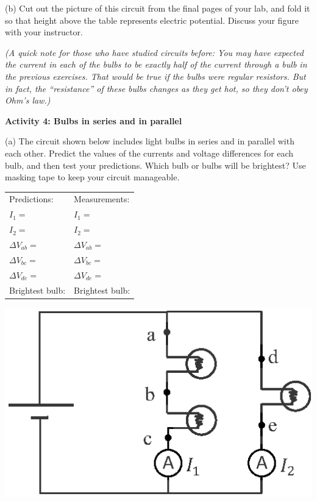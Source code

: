 (b) Cut out the picture of this circuit from the final pages of your lab, and fold it so that height above the table represents electric potential.  Discuss your figure with your instructor. 

\textit{(A quick note for those who have studied circuits before:  You may have expected the current in each of the bulbs to be exactly half of the current through a bulb in the previous exercises.  That would be true if the bulbs were regular resistors.  But in fact, the ``resistance'' of these bulbs changes as they get hot, so they don't obey Ohm's law.)}

\textbf{Activity 4: Bulbs in series and in parallel} \par
\nopagebreak
(a) The circuit shown below includes light bulbs in series and in parallel with each other.  Predict the values of the currents and voltage differences for each bulb, and then test your predictions.  Which bulb or bulbs will be brightest? Use masking tape to keep your circuit manageable.


\begin{minipage}{0.6\textwidth}
\vspace{0.1 in}
{\renewcommand{\arraystretch}{1.6}
\hspace*{0.5in}
\begin{tabular}{l l}
Predictions: \hspace{0.7in} & Measurements: \\
$I_1 =$ & $I_1 =$ \\
$I_2 =$ & $I_2 =$ \\
$\Delta V_{ab} =$ & $\Delta V_{ab} =$ \\
$\Delta V_{bc} =$ & $\Delta V_{bc} =$ \\
$\Delta V_{de} =$ & $\Delta V_{de} =$ \\
Brightest bulb: & Brightest bulb: \\
\end{tabular}}
\vspace{0.3in}
\end{minipage}
\begin{minipage}{0.4\textwidth}
\includegraphics[width=\textwidth]{electric_circuits/circ_diag5.eps}
\end{minipage}



